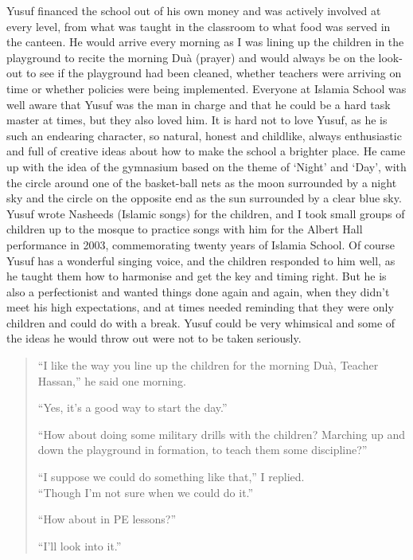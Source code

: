 \documentclass[12pt]{memoir}
\begin{document}
Yusuf financed the school out of his own money
and was actively involved at every level,
from what was taught in the classroom to what food was served in the canteen.
He would arrive every morning as I was lining up the children
in the playground to recite the morning Du\`a (prayer)
and would always be on the look-out to see if the playground had been cleaned,
whether teachers were arriving on time
or whether policies were being implemented.
Everyone at Islamia School was well aware that Yusuf was the man in charge
and that he could be a hard task master at times, but they also loved him.
It is hard not to love Yusuf, as he is such an endearing character,
so natural, honest and childlike,
always enthusiastic and full of creative ideas
about how to make the school a brighter place.
He came up with the idea of  the gymnasium
based on the theme of ‘Night’ and ‘Day’,
with the circle around one of the basket-ball nets
as the moon surrounded by a night sky and the circle on the opposite end
as the sun surrounded by a clear blue sky.
Yusuf wrote Nasheeds (Islamic songs) for the children,
and I took small groups of children up to the mosque to practice songs
with him for the Albert Hall performance in 2003,
commemorating twenty years of Islamia School.
Of course Yusuf has a wonderful singing voice,
and the children responded to him well,
as he taught them how to harmonise and get the key and timing right.
But he is also a perfectionist and wanted things done again and again,
when they didn’t meet his high expectations,
and at times needed reminding that they were only children
and could do with a break.
Yusuf could be very whimsical and some of the ideas
he would throw out were not to be taken seriously.

\begin{quote}
“I like the way you line up the children for the morning Du\`a,
Teacher Hassan,” he said one morning.

“Yes, it’s a good way to start the day.”

“How about doing some military drills with the children?
Marching up and down the playground in formation,
to teach them some discipline?”

“I suppose we could do something like that,” I replied.\\
“Though I’m not sure when we could do it.”

“How about in PE lessons?”

“I’ll look into it.”
\end{quote}
\end{document}
